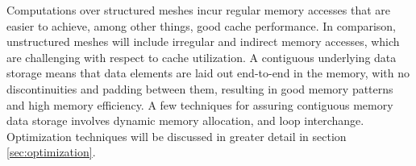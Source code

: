 Computations over structured meshes incur regular memory accesses that are easier to achieve, among other things, good cache performance. In comparison, unstructured meshes will include irregular and indirect memory accesses, which are challenging with respect to cache utilization.
A contiguous underlying data storage means that data elements are laid out end-to-end in the memory, with no discontinuities and padding between them, resulting in good memory patterns and high memory efficiency. A few techniques for assuring contiguous memory data storage involves dynamic memory allocation, and loop interchange. Optimization techniques will be discussed in greater detail in section \ref{sec:optimization}. 









